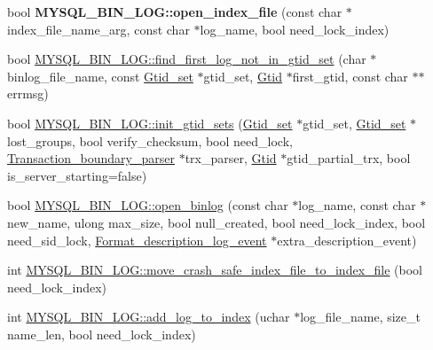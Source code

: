 \begin{DoxyCompactItemize}
\item 
\mbox{\label{group__Binary__Log_gacc6f71042007e6a8cf40b5b4a95d562b}} 
bool {\bfseries M\+Y\+S\+Q\+L\+\_\+\+B\+I\+N\+\_\+\+L\+O\+G\+::open\+\_\+index\+\_\+file} (const char $\ast$index\+\_\+file\+\_\+name\+\_\+arg, const char $\ast$log\+\_\+name, bool need\+\_\+lock\+\_\+index)
\item 
bool \mbox{\hyperlink{group__Binary__Log_gab8925923df0bf9cd07f7fcaf45f8db16}{M\+Y\+S\+Q\+L\+\_\+\+B\+I\+N\+\_\+\+L\+O\+G\+::find\+\_\+first\+\_\+log\+\_\+not\+\_\+in\+\_\+gtid\+\_\+set}} (char $\ast$binlog\+\_\+file\+\_\+name, const \mbox{\hyperlink{classGtid__set}{Gtid\+\_\+set}} $\ast$gtid\+\_\+set, \mbox{\hyperlink{structGtid}{Gtid}} $\ast$first\+\_\+gtid, const char $\ast$$\ast$errmsg)
\item 
bool \mbox{\hyperlink{group__Binary__Log_gab52138e0e18c6bca2812e4051164db4f}{M\+Y\+S\+Q\+L\+\_\+\+B\+I\+N\+\_\+\+L\+O\+G\+::init\+\_\+gtid\+\_\+sets}} (\mbox{\hyperlink{classGtid__set}{Gtid\+\_\+set}} $\ast$gtid\+\_\+set, \mbox{\hyperlink{classGtid__set}{Gtid\+\_\+set}} $\ast$lost\+\_\+groups, bool verify\+\_\+checksum, bool need\+\_\+lock, \mbox{\hyperlink{classTransaction__boundary__parser}{Transaction\+\_\+boundary\+\_\+parser}} $\ast$trx\+\_\+parser, \mbox{\hyperlink{structGtid}{Gtid}} $\ast$gtid\+\_\+partial\+\_\+trx, bool is\+\_\+server\+\_\+starting=false)
\item 
bool \mbox{\hyperlink{group__Binary__Log_ga8614d8fb3c4c2c255145d6cfd992e8d8}{M\+Y\+S\+Q\+L\+\_\+\+B\+I\+N\+\_\+\+L\+O\+G\+::open\+\_\+binlog}} (const char $\ast$log\+\_\+name, const char $\ast$new\+\_\+name, ulong max\+\_\+size, bool null\+\_\+created, bool need\+\_\+lock\+\_\+index, bool need\+\_\+sid\+\_\+lock, \mbox{\hyperlink{classFormat__description__log__event}{Format\+\_\+description\+\_\+log\+\_\+event}} $\ast$extra\+\_\+description\+\_\+event)
\item 
int \mbox{\hyperlink{group__Binary__Log_gab57cd148796a62181465bb25db0e236c}{M\+Y\+S\+Q\+L\+\_\+\+B\+I\+N\+\_\+\+L\+O\+G\+::move\+\_\+crash\+\_\+safe\+\_\+index\+\_\+file\+\_\+to\+\_\+index\+\_\+file}} (bool need\+\_\+lock\+\_\+index)
\item 
int \mbox{\hyperlink{group__Binary__Log_gaddc5340a448c8179ab35b3f2e0891984}{M\+Y\+S\+Q\+L\+\_\+\+B\+I\+N\+\_\+\+L\+O\+G\+::add\+\_\+log\+\_\+to\+\_\+index}} (uchar $\ast$log\+\_\+file\+\_\+name, size\+\_\+t name\+\_\+len, bool need\+\_\+lock\+\_\+index)
\item 
\mbox{\label{group__Binary__Log_gaa05a10f5039b9a66e92e057c8c632dff}} 
$$
\end{DoxyCompactItemize}
